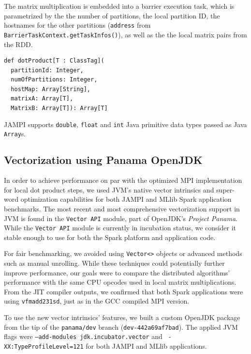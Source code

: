 \documentclass[bdcc,article,submit,moreauthors,pdftex]{Definitions/mdpi}
\begin{document}
The matrix multiplication is embedded into a barrier execution task, which is parametrized by the the number of partitions, the local partition ID, the hostnames for the other partitions (\texttt{address} from \texttt{BarrierTaskContext.getTaskInfos()}), as well as the  the local matrix pairs from the RDD.

\begin{lstlisting}
def dotProduct[T : ClassTag](
  partitionId: Integer,
  numOfPartitions: Integer,
  hostMap: Array[String],
  matrixA: Array[T],
  MatrixB: Array[T]): Array[T] 
\end{lstlisting}

JAMPI supports \texttt{double}, \texttt{float} and \texttt{int} Java primitive data types passed as Java \texttt{Array}s.


\subsection{Vectorization using Panama OpenJDK} %
\label{sub:vector_panama}

In order to achieve performance on par with the optimized MPI implementation for local dot product steps, we used JVM's native vector intrinsics and super-word optimization capabilities for both JAMPI and MLlib Spark application benchmarks. The most recent and most comprehensive vectorization support in JVM is found in the \texttt{Vector API} module, part of OpenJDK's \emph{Project Panama}. While the \texttt{Vector API} module is currently in incubation status, we consider it stable enough to use for both the Spark platform and application code.

For fair benchmarking, we avoided using \texttt{Vector<>} objects or advanced methods such as manual unrolling. While these techniques could potentially further improve performance, our goals were to compare the distributed algorithms' performance with the same CPU opcodes used in local matrix multiplications. From the JIT compiler outputs, we confirmed that both Spark applications were using \texttt{vfmadd231sd}, just as in the GCC compiled MPI version.

To use the new vector intrinsics' features, we built a custom OpenJDK package from the tip of the \texttt{panama/dev} branch (\texttt{dev-442a69af7bad}). The applied JVM flags were \texttt{--add-modules jdk.incubator.vector} and \texttt{ -XX:TypeProfileLevel=121} for both JAMPI and MLlib applications. 
\end{document}
